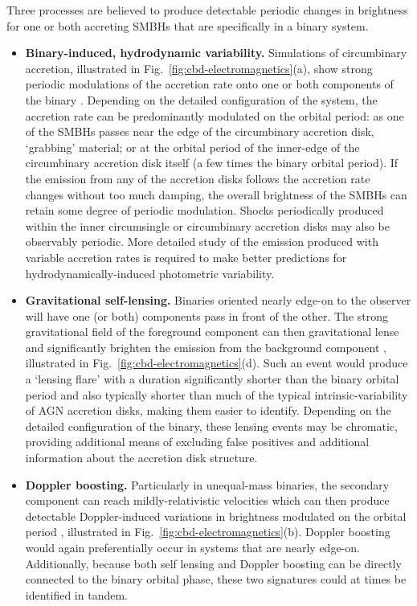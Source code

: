 \documentclass[onecolumn,authoryear]{els-mrw}
\begin{document}
Three processes are believed to produce detectable periodic changes in brightness for one or both accreting SMBHs that are specifically in a binary system.
\begin{itemize}
\item \textbf{Binary-induced, hydrodynamic variability.}  Simulations of circumbinary accretion, illustrated in Fig.~\ref{fig:cbd-electromagnetics}(a), show strong periodic modulations of the accretion rate onto one or both components of the binary \citep{Farris+2014}.  Depending on the detailed configuration of the system, the accretion rate can be predominantly modulated on the orbital period: as one of the SMBHs passes near the edge of the circumbinary accretion disk, `grabbing' material; or at the orbital period of the inner-edge of the circumbinary accretion disk itself (a few times the binary orbital period).  If the emission from any of the accretion disks follows the accretion rate changes without too much damping, the overall brightness of the SMBHs can retain some degree of periodic modulation.  Shocks periodically produced within the inner circumsingle or circumbinary accretion disks may also be observably periodic.  More detailed study of the emission produced with variable accretion rates is required to make better predictions for hydrodynamically-induced photometric variability.
\item \textbf{Gravitational self-lensing.}  Binaries oriented nearly edge-on to the observer will have one (or both) components pass in front of the other.  The strong gravitational field of the foreground component can then gravitational lense and significantly brighten the emission from the background component \citep{D'Orazio+DiStefano-2018}, illustrated in Fig.~\ref{fig:cbd-electromagnetics}(d).  Such an event would produce a `lensing flare' with a duration significantly shorter than the binary orbital period and also typically shorter than much of the typical intrinsic-variability of AGN accretion disks, making them easier to identify.  Depending on the detailed configuration of the binary, these lensing events may be chromatic, providing additional means of excluding false positives and additional information about the accretion disk structure.
\item \textbf{Doppler boosting.}  Particularly in unequal-mass binaries, the secondary component can reach mildly-relativistic velocities which can then produce detectable Doppler-induced variations in brightness modulated on the orbital period \citep{D'Orazio+2015}, illustrated in Fig.~\ref{fig:cbd-electromagnetics}(b).  Doppler boosting would again preferentially occur in systems that are nearly edge-on.  Additionally, because both self lensing and Doppler boosting can be directly connected to the binary orbital phase, these two signatures could at times be identified in tandem.
\end{itemize}
\end{document}
